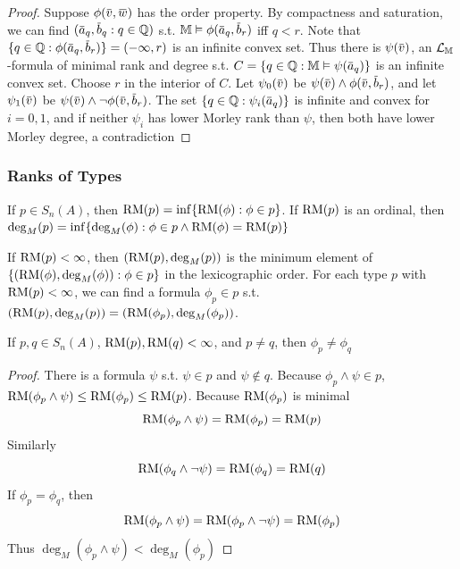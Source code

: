 \documentclass[11pt]{article}
\begin{document}
\begin{proof}
Suppose \(\phi(\barv,\barw)\) has the order property. By compactness and saturation, we can
find \((\bara_q,\barb_q:q\in\Q)\) s.t. \(\M\vDash\phi(\bara_q,\barb_r)\) iff \(q<r\).
Note that \(\{q\in\Q:\phi(\bara_q,\barb_r)\}=(-\infty,r)\) is an infinite convex set. Thus there
is \(\psi(\barv)\), an \(\mathcal{L}_{\mathbb{M}}\)-formula of minimal rank and degree s.t. \(C=\{q\in\Q:\M\vDash\psi(\bara_q)\}\)
is an infinite convex set.
Choose \(r\) in the interior of \(C\). Let \(\psi_0(\barv)\) be \(\psi(\barv)\wedge\phi(\barv,\barb_r)\), and
let \(\psi_1(\barv)\) be \(\psi(\barv)\wedge\neg\phi(\barv,\barb_r)\). The set \(\{q\in\Q:\psi_i(\bara_q)\}\) is infinite
and convex for \(i=0,1\), and if neither \(\psi_i\) has lower Morley rank than \(\psi\), then both have
lower Morley degree, a contradiction
\end{proof}
\subsubsection{Ranks of Types}
\label{sec:org47fb1f3}
\begin{definition}[]
If \(p\in S_n(A)\), then \(\operatorname{RM}(p)=\inf\{\operatorname{RM}(\phi):\phi\in p\}\). If \(\operatorname{RM}(p)\) is an ordinal,
then \(\deg_M(p)=\inf\{\deg_M(\phi):\phi\in p\wedge\operatorname{RM}(\phi)=\operatorname{RM}(p)\}\)
\end{definition}

If \(\operatorname{RM}(p)<\infty\), then \((\operatorname{RM}(p),\deg_M(p))\) is the minimum element
of \(\{(\operatorname{RM}(\phi),\deg_M(\phi)):\phi\in p\}\) in the lexicographic order. For each type \(p\)
with \(\operatorname{RM}(p)<\infty\), we can find a formula \(\phi_p\in p\)
s.t. \((\operatorname{RM}(p),\deg_M(p))=(\operatorname{RM}(\phi_p),\deg_M(\phi_p))\).

\begin{lemma}[]
If \(p,q\in S_n(A)\), \(\operatorname{RM}(p),\operatorname{RM}(q)<\infty\), and \(p\neq q\), then \(\phi_p\neq\phi_q\)
\end{lemma}

\begin{proof}
There is a formula \(\psi\) s.t. \(\psi\in p\) and \(\psi\notin q\).
Because \(\phi_p\wedge\psi\in p\), \(\operatorname{RM}(\phi_p\wedge\psi)\le\operatorname{RM}(\phi_p)\le\operatorname{RM}(p)\). Because \(\operatorname{RM}(\phi_p)\) is minimal
\begin{equation*}
\operatorname{RM}(\phi_p\wedge\psi)=\operatorname{RM}(\phi_p)=\operatorname{RM}(p)
\end{equation*}
Similarly
\begin{equation*}
\operatorname{RM}(\phi_q\wedge\neg\psi)=\operatorname{RM}(\phi_q)=\operatorname{RM}(q)
\end{equation*}
If \(\phi_p=\phi_q\), then
\begin{equation*}
\operatorname{RM}(\phi_p\wedge\psi)=\operatorname{RM}(\phi_p\wedge\neg\psi)=\operatorname{RM}(\phi_p)
\end{equation*}
Thus \(\deg_M(\phi_p\wedge\psi)<\deg_M(\phi_p)\)
\end{proof}
\end{document}
